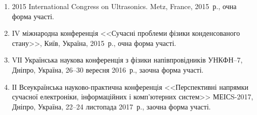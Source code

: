 \begin{enumerate}[label=\arabic*.,leftmargin=1em,itemindent=1em]
\item
2015 International Congress on Ultrasonics. Metz, France, 2015~р., очна форма участі.

\item
IV міжнародна конференція <<Сучасні проблеми фізики конденсованого стану>>, Київ, Україна, 2015~р., очна форма участі.

\item
VІІ Українська наукова конференція з фізики напівпровідників УНКФН--7, Дніпро, Україна, 26--30 вересня 2016~р., заочна форма участі.


\item
ІІ Всеукраїнська науково-практична конференція <<Перспективні напрямки 
сучасної електроніки, 
інформаційних і комп'ютерних 
систем>> МЕІСS-2017, Дніпро, Україна, 22--24 листопада 2017~р., заочна форма участі.

\end{enumerate}
%
%
%
%

